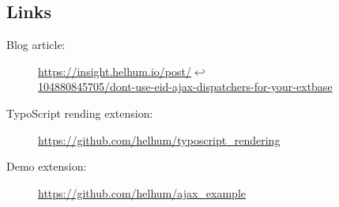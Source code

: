 \subsection{Links}

\begin{description}
  \item[Blog article:] \url{https://insight.helhum.io/post/}$\hookleftarrow$\\ \url{104880845705/dont-use-eid-ajax-dispatchers-for-your-extbase}
  \item[TypoScript rending extension:] \url{https://github.com/helhum/typoscript_rendering}
  \item[Demo extension:] \url{https://github.com/helhum/ajax_example}
\end{description}
